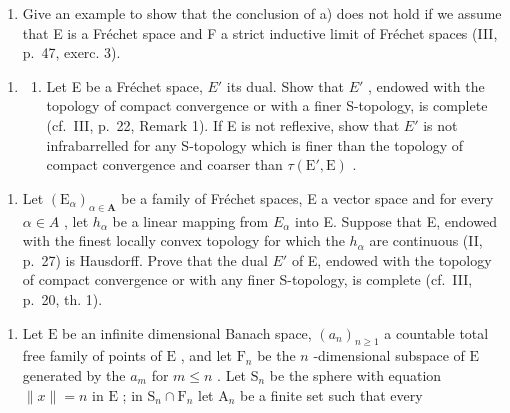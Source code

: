 \begin{enumerate}
\def\labelenumi{\alph{enumi})}
\setcounter{enumi}{1}
\tightlist
\item
  Give an example to show that the conclusion of a) does not hold if we assume that E is a Fréchet space and F a strict inductive limit of Fréchet spaces (III, p.~47, exerc. 3).
\end{enumerate}

\begin{enumerate}
\def\labelenumi{\arabic{enumi})}
\setcounter{enumi}{13}
\tightlist
\item
  \begin{enumerate}
  \def\labelenumii{\alph{enumii})}
  \tightlist
  \item
    Let E be a Fréchet space, \(E'\) its dual. Show that \(E'\) , endowed with the topology of compact convergence or with a finer S-topology, is complete (cf.~III, p.~22, Remark 1). If E is not reflexive, show that \(E'\) is not infrabarrelled for any S-topology which is finer than the topology of compact convergence and coarser than \(\tau(\mathrm{E}', \mathrm{E})\) .
  \end{enumerate}
\end{enumerate}

\begin{enumerate}
\def\labelenumi{\alph{enumi})}
\setcounter{enumi}{1}
\tightlist
\item
  Let \((\mathrm{E}_{\alpha})_{\alpha\in\mathbf{A}}\) be a family of Fréchet spaces, E a vector space and for every \(\alpha\in A\) , let \(h_{\alpha}\) be a linear mapping from \(E_{\alpha}\) into E. Suppose that E, endowed with the finest locally convex topology for which the \(h_{\alpha}\) are continuous (II, p.~27) is Hausdorff. Prove that the dual \(E'\) of E, endowed with the topology of compact convergence or with any finer S-topology, is complete (cf.~III, p.~20, th. 1).
\end{enumerate}

\begin{enumerate}
\def\labelenumi{\arabic{enumi})}
\setcounter{enumi}{14}
\tightlist
\item
  Let \(\mathrm{E}\) be an infinite dimensional Banach space, \((a_{n})_{n\geqslant 1}\) a countable total free family of points of \(\mathrm{E}\) , and let \(\mathrm{F}_n\) be the \(n\) -dimensional subspace of \(\mathrm{E}\) generated by the \(a_{m}\) for \(m\leqslant n\) . Let \(\mathrm{S}_n\) be the sphere with equation \(\| x\| = n\) in \(\mathrm{E}\) ; in \(\mathrm{S}_n\cap \mathrm{F}_n\) let \(\mathrm{A}_n\) be a finite set such that every
\end{enumerate}

